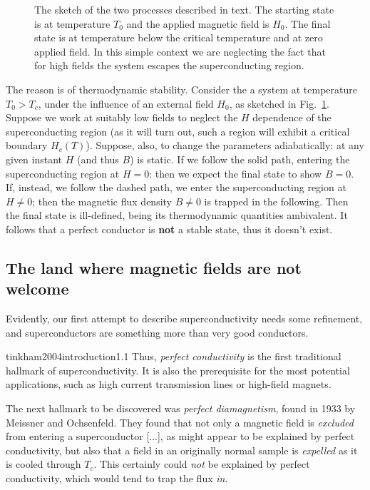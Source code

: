 \begin{figure}
    \centering
    
    \caption{The sketch of the two processes described in text. The starting state is at temperature $T_0$ and the applied magnetic field is $H_0$. The final state is at temperature below the critical temperature and at zero applied field. In this simple context we are neglecting the fact that for high fields the system escapes the superconducting region.}
    \label{fig:perfect conductors and thermodynamics}
\end{figure}

The reason is of thermodynamic stability. Consider the a system at temperature $T_0 > T_c$, under the influence of an external field $H_0$, as sketched in Fig.~\ref{fig:perfect conductors and thermodynamics}. Suppose we work at suitably low fields to neglect the $H$ dependence of the superconducting region (as it will turn out, such a region will exhibit a critical boundary $H_c(T)$). Suppose, also, to change the parameters adiabatically: at any given instant $H$ (and thus $B$) is static. If we follow the solid path, entering the superconducting region at $H=0$: then we expect the final state to show $B=0$. If, instead, we follow the dashed path, we enter the superconducting region at $H\neq 0$; then the magnetic flux density $B\neq 0$ is trapped in the following. Then the final state is ill-defined, being its thermodynamic quantities ambivalent. It follows that a perfect conductor is \textbf{not} a stable state, thus it doesn't exist.

\subsection{The land where magnetic fields are not welcome}

Evidently, our first attempt to describe superconductivity needs some refinement, and superconductors are something more than very good conductors.

\begin{cit}{tinkham2004introduction}{1.1}
    Thus, \textit{perfect conductivity} is the first traditional hallmark of superconductivity. It is also the prerequisite for the most potential applications, such as high current transmission lines or high-field magnets.

    The next hallmark to be discovered was \textit{perfect diamagnetism}, found in 1933 by Meissner and Ochsenfeld. They found that not only a magnetic field is \textit{excluded} from entering a superconductor [...], as might appear to be explained by perfect conductivity, but also that a field in an originally normal sample is \textit{expelled} as it is cooled through $T_c$. This certainly could \textit{not} be explained by perfect conductivity, which would tend to trap the flux \textit{in}.
\end{cit}

